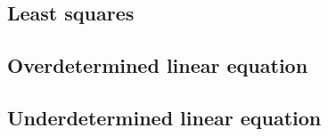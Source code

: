 \subsection{Least squares}
\subsection{Overdetermined linear equation}
\subsection{Underdetermined linear equation}
